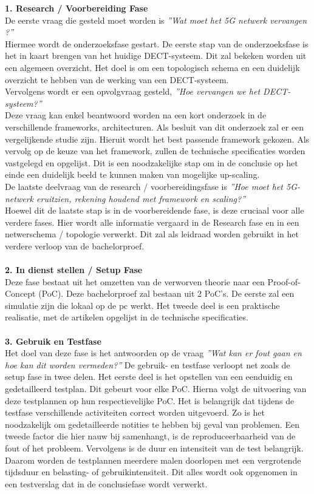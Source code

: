 \textbf{1. Research / Voorbereiding Fase}\\
De eerste vraag die gesteld moet worden is \textit{''Wat moet het 5G netwerk vervangen ?''} \\
Hiermee wordt de onderzoeksfase gestart. De eerste stap van de onderzoeksfase is het in kaart brengen van het huidige DECT-systeem. Dit zal bekeken worden uit een algemeen overzicht. Het doel is om een topologisch schema en een duidelijk overzicht te hebben van de werking van een DECT-systeem.\\
Vervolgens wordt er een opvolgvraag gesteld, \textit{''Hoe vervangen we het DECT-systeem?''}\\ Deze vraag kan enkel beantwoord worden na een kort onderzoek in de verschillende frameworks, architecturen. Als besluit van dit onderzoek zal er een vergelijkende studie zijn. Hieruit wordt het best passende framework gekozen.
Als vervolg op de keuze van het framework, zullen de technische specificaties worden vastgelegd en opgelijst. Dit is een noodzakelijke stap om in de conclusie op het einde een duidelijk beeld te kunnen maken van mogelijke up-scaling.\\
De laatste deelvraag van de research / voorbereidingsfase is \textit{''Hoe moet het 5G-netwerk eruitzien, rekening houdend met framework en scaling?''}\\ Hoewel dit de laatste stap is in de voorbereidende fase, is deze cruciaal voor alle verdere fases. Hier wordt alle informatie vergaard in de Research fase en in een netwerschema / topologie verwerkt. Dit zal als leidraad worden gebruikt in het verdere verloop van de bachelorproef.\\\\
\textbf{2. In dienst stellen / Setup Fase}\\
Deze fase bestaat uit het omzetten van de verworven theorie naar een Proof-of-Concept (PoC). Deze bachelorproef zal bestaan uit 2 PoC's. De eerste zal een simulatie zijn die lokaal op de pc werkt. Het tweede deel is een praktische realisatie, met de artikelen opgelijst in de technische specificaties. \\\\
\textbf{3. Gebruik en Testfase}\\
Het doel van deze fase is het antwoorden op de vraag \textit{''Wat kan er fout gaan en hoe kan dit worden vermeden?''} De gebruik- en testfase verloopt net zoals de setup fase in twee delen. Het eerste deel is het opstellen van een eenduidig en gedetailleerd testplan. Dit gebeurt voor elke PoC. Hierna volgt de uitvoering van deze testplannen op hun respectievelijke PoC. Het is belangrijk dat tijdens de testfase verschillende activiteiten correct worden uitgevoerd. Zo is het noodzakelijk om gedetailleerde notities te hebben bij geval van problemen. Een tweede factor die hier nauw bij samenhangt, is de reproduceerbaarheid van de fout of het probleem. Vervolgens is de duur en intensiteit van de test belangrijk. Daarom worden de testplannen meerdere malen doorlopen met een vergrotende tijdsduur en belasting- of gebruikintensiteit. Dit alles wordt ook opgenomen in een testverslag dat in de conclusiefase wordt verwerkt.\\\\

